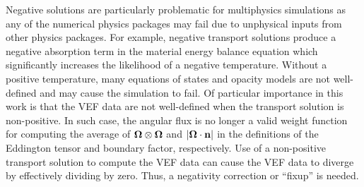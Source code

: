 \documentclass[../doc.tex]{subfiles}
\begin{document}
Negative solutions are particularly problematic for multiphysics simulations as any of the numerical physics packages may fail due to unphysical inputs from other physics packages. For example, negative transport solutions produce a negative absorption term in the material energy balance equation which significantly increases the likelihood of a negative temperature. Without a positive temperature, many equations of states and opacity models are not well-defined and may cause the simulation to fail. Of particular importance in this work is that the VEF data are not well-defined when the transport solution is non-positive. In such case, the angular flux is no longer a valid weight function for computing the average of $\boldsymbol{\Omega}\otimes\boldsymbol{\Omega}$ and $|\boldsymbol{\Omega}\cdot\boldsymbol{\mathrm{n}}|$ in the definitions of the Eddington tensor and boundary factor, respectively. Use of a non-positive transport solution to compute the VEF data can cause the VEF data to diverge by effectively dividing by zero. 
Thus, a negativity correction or ``fixup'' is needed. 
\end{document}
